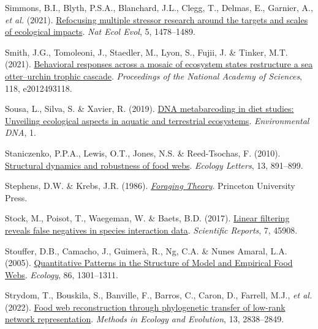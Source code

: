 \documentclass[
]{article}
\newlength{\cslhangindent}
\newenvironment{CSLReferences}[2] %
 {\begin{list}{}{%
  \setlength{\itemindent}{0pt}
  \setlength{\leftmargin}{0pt}
  \setlength{\parsep}{0pt}
  \ifodd #1
   \setlength{\leftmargin}{\cslhangindent}
   \setlength{\itemindent}{-1\cslhangindent}
  \fi
  \setlength{\itemsep}{#2\baselineskip}}}
 {\end{list}}
\begin{document}
\begin{CSLReferences}{1}{0}
Simmons, B.I., Blyth, P.S.A., Blanchard, J.L., Clegg, T., Delmas, E.,
Garnier, A., \emph{et al.} (2021).
\href{https://doi.org/10.1038/s41559-021-01547-4}{Refocusing multiple
stressor research around the targets and scales of ecological impacts}.
\emph{Nat Ecol Evol}, 5, 1478--1489.

Smith, J.G., Tomoleoni, J., Staedler, M., Lyon, S., Fujii, J. \& Tinker,
M.T. (2021). \href{https://doi.org/10.1073/pnas.2012493118}{Behavioral
responses across a mosaic of ecosystem states restructure a sea
otter--urchin trophic cascade}. \emph{Proceedings of the National
Academy of Sciences}, 118, e2012493118.

Sousa, L., Silva, S. \& Xavier, R. (2019).
\href{https://ora.ox.ac.uk/objects/uuid:65b3702c-8a72-40ca-b4dc-29836bec6191}{{DNA}
metabarcoding in diet studies: {Unveiling} ecological aspects in aquatic
and terrestrial ecosystems}. \emph{Environmental DNA}, 1.

Staniczenko, P.P.A., Lewis, O.T., Jones, N.S. \& Reed-Tsochas, F.
(2010).
\href{https://doi.org/10.1111/j.1461-0248.2010.01485.x}{Structural
dynamics and robustness of food webs}. \emph{Ecology Letters}, 13,
891--899.

Stephens, D.W. \& Krebs, J.R. (1986).
\emph{\href{https://doi.org/10.2307/j.ctvs32s6b}{Foraging {Theory}}}.
Princeton University Press.

Stock, M., Poisot, T., Waegeman, W. \& Baets, B.D. (2017).
\href{https://doi.org/10.1038/srep45908}{Linear filtering reveals false
negatives in species interaction data}. \emph{Scientific Reports}, 7,
45908.

Stouffer, D.B., Camacho, J., Guimerà, R., Ng, C.A. \& Nunes Amaral, L.A.
(2005). \href{https://doi.org/10.1890/04-0957}{Quantitative {Patterns}
in the {Structure} of {Model} and {Empirical Food Webs}}.
\emph{Ecology}, 86, 1301--1311.

Strydom, T., Bouskila, S., Banville, F., Barros, C., Caron, D., Farrell,
M.J., \emph{et al.} (2022).
\href{https://doi.org/10.1111/2041-210X.13835}{Food web reconstruction
through phylogenetic transfer of low-rank network representation}.
\emph{Methods in Ecology and Evolution}, 13, 2838--2849.


\end{CSLReferences}
\end{document}
